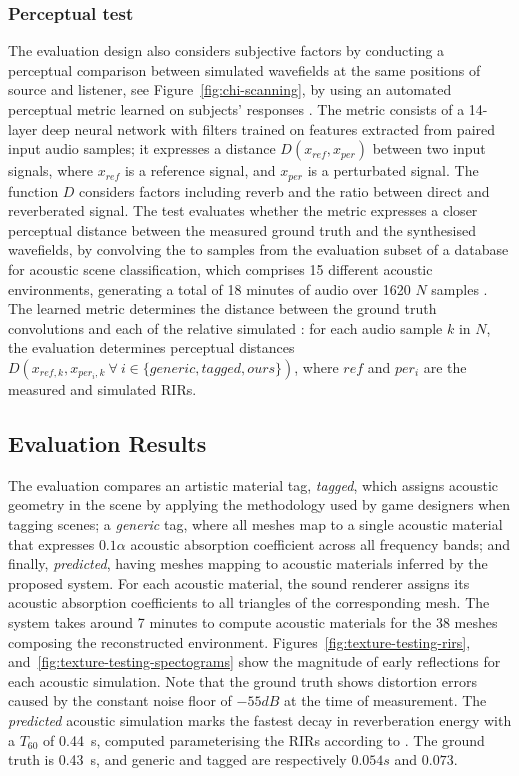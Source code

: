 \subsubsection{Perceptual test}
The evaluation design also considers subjective factors by conducting a perceptual comparison between simulated wavefields at the same positions of source and listener, see Figure~\ref{fig:chi-scanning}, by using an automated perceptual metric learned on subjects’ responses \cite{manocha2020differentiable}. The metric consists of a 14-layer deep neural network with filters trained on features extracted from paired input audio samples; it expresses a distance $D(x_{ref}, x_{per})$ between two input signals, where $x_{ref}$ is a reference signal, and $x_{per}$ is a perturbated signal. The function $D$ considers factors including reverb and the ratio between direct and reverberated signal. The test evaluates whether the metric expresses a closer perceptual distance between the measured ground truth and the synthesised wavefields, by convolving the  to samples from the evaluation subset of a database for acoustic scene classification, which comprises 15 different acoustic environments, generating a total of 18 minutes of audio over 1620 $N$ samples \citep{mesaros2016tut}. The learned metric determines the distance between the ground truth convolutions and each of the relative simulated : for each audio sample $k$ in $N$, the evaluation determines perceptual distances $D(x_{ref, k}, x_{per_i, k}~\forall~i \in \{generic, tagged, ours\})$, where $ref$ and $per_i$ are the measured and simulated RIRs.

\subsection{Evaluation Results}
The evaluation compares an artistic material tag, \emph{tagged}, which assigns acoustic geometry in the scene by applying the methodology used by game designers when tagging scenes; a \emph{generic} tag, where all meshes map to a single acoustic material that expresses $0.1\alpha$ acoustic absorption coefficient across all frequency bands; and finally, \emph{predicted}, having meshes mapping to acoustic materials inferred by the proposed system. For each acoustic material, the sound renderer assigns its acoustic absorption coefficients to all triangles of the corresponding mesh.
The system takes around 7 minutes to compute acoustic materials for the 38 meshes composing the reconstructed environment.
Figures~\ref{fig:texture-testing-rirs}, and~\ref{fig:texture-testing-spectograms} show the magnitude of early reflections for each acoustic simulation. Note that the ground truth shows distortion errors caused by the constant noise floor of $-55dB$ at the time of measurement. The \emph{predicted} acoustic simulation marks the fastest decay in reverberation energy with a $T_{60}$ of \qty{0.44}{\second}, computed parameterising the RIRs according to \cite{lima_RIR_Parameters}. The ground truth is \qty{0.43}{\second}, and generic and tagged are respectively $0.054s$ and $0.073$.


